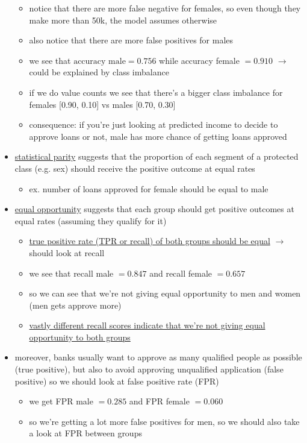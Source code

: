 \documentclass[10.5pt,a4paper, fleqn, dvipsnames]{article}
\begin{document}
\begin{itemize}
\begin{itemize}
        \item notice that there are more false negative for females, so even though they make more than 50k, the model assumes otherwise
        \item also notice that there are more false positives for males
        \item we see that $\text{accuracy male} = 0.756$ while accuracy female $= 0.910$ $\rightarrow$ could be explained by class imbalance 
        \item if we do value counts we see that there's a bigger class imbalance for females [0.90, 0.10] vs males [0.70, 0.30]
        \item consequence: if you're just looking at predicted income to decide to approve loans or not, male has more chance of getting loans approved
    \end{itemize}
\item \ul{statistical parity} suggests that the proportion of each segment of a protected class (e.g. sex) should receive the positive outcome at equal rates
\begin{itemize}[leftmargin = 2em]
    \item ex. number of loans approved for female should be equal to male
\end{itemize}
\item \ul{equal opportunity} suggests that each group should get positive outcomes at equal rates (assuming they qualify for it) 
\begin{itemize}
    \item \ul{true positive rate (TPR or recall) of both groups should be equal} $\rightarrow$ should look at recall
    \item we see that recall male $= 0.847$ and recall female $= 0.657$
    \item so we can see that we're not giving equal opportunity to men and women (men gets approve more) 
    \item \ul{vastly different recall scores indicate that we're not giving equal opportunity to both groups}
\end{itemize}
\item moreover, banks usually want to approve as many qualified people as possible (true positive), but also to avoid approving unqualified application (false positive) so we should look at false positive rate (FPR)
\begin{itemize}
    \item we get FPR male $= 0.285$ and FPR female $= 0.060$
    \item so we're getting a lot more false positives for men, so we should also take a look at FPR between groups
\end{itemize}
\end{itemize}
\end{document}
